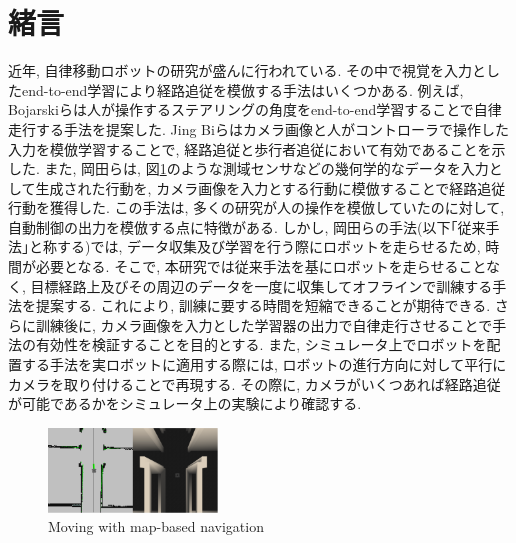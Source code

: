 \documentclass{ujarticle}
\begin{document}
\small
\section{緒言}%
近年, 自律移動ロボットの研究が盛んに行われている. その中で視覚を入力としたend-to-end学習により経路追従を模倣する手法はいくつかある. 例えば, Bojarskiら\cite{bojarski}は人が操作するステアリングの角度をend-to-end学習することで自律走行する手法を提案した. Jing Biら\cite{pedestrian}はカメラ画像と人がコントローラで操作した入力を模倣学習することで, 経路追従と歩行者追従において有効であることを示した. また, 岡田ら\cite{si2020-okada}\cite{si2021-okada}は, 図\ref{Fig:navigation}のような測域センサなどの幾何学的なデータを入力として生成された行動を, カメラ画像を入力とする行動に模倣することで経路追従行動を獲得した. この手法は, 多くの研究\cite{bojarski}\cite{pedestrian}が人の操作を模倣していたのに対して, 自動制御の出力を模倣する点に特徴がある. しかし, 岡田らの手法(以下｢従来手法｣と称する)では, データ収集及び学習を行う際にロボットを走らせるため, 時間が必要となる. そこで, 本研究では従来手法を基にロボットを走らせることなく, 目標経路上及びその周辺のデータを一度に収集してオフラインで訓練する手法を提案する. これにより, 訓練に要する時間を短縮できることが期待できる. さらに訓練後に, カメラ画像を入力とした学習器の出力で自律走行させることで手法の有効性を検証することを目的とする. また, シミュレータ上でロボットを配置する手法を実ロボットに適用する際には, ロボットの進行方向に対して平行にカメラを取り付けることで再現する. その際に, カメラがいくつあれば経路追従が可能であるかをシミュレータ上の実験により確認する. 

\begin{figure}[b]
	\centering
	\includegraphics[width=0.4\textwidth]{img/navigation.png}
	\caption{Moving with map-based navigation}
	\label{Fig:navigation}
\end{figure}
\end{document}
